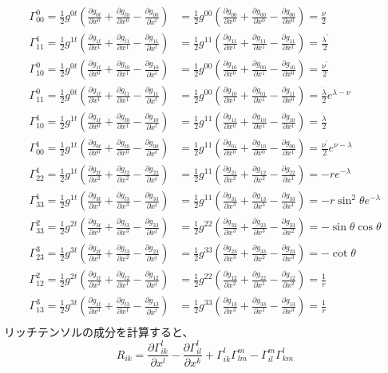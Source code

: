 \documentclass{jsarticle}
\newcommand{\pder}[2][]{\frac{\partial#1}{\partial#2}}
\newcommand{\pderx}[2][]{\pder[#1]{x^{#2}}}
\newcommand{\pdergx}[2][]{\pderx[g_{#1}]{#2}}
\newcommand{\half}{\frac{1}{2}}
\newcommand{\beq}{\begin{equation}}
\newcommand{\eeq}{\end{equation}}
\newcommand{\GaT}[3]{\Gamma^{#1}_{#2 #3}}
\newcommand{\Christfinside}[3]{\pdergx[#1 #3]{#2} + \pdergx[#3 #2]{#1} - \pdergx[#1 #2]{#3}}
\newcommand{\Christf}[4]{\Gamma^{#1}_{#2 #3}=\half g^{#1 #4}(\Christfinside{#2}{#3}{#4})}
\begin{document}
\begin{align}
    \Christf{0}{0}{0}{t} &=  \half g^{00} (\Christfinside{0}{0}{0}) = \frac{\dot{\nu}}{2}\\
    \Christf{1}{1}{1}{t} &=  \half g^{11} (\Christfinside{1}{1}{1}) = \frac{\lambda^\prime}{2}\\
    \Christf{0}{1}{0}{t} &=  \half g^{00} (\Christfinside{1}{0}{0}) = \frac{\nu^\prime}{2}\\
    \Christf{0}{1}{1}{t} &=  \half g^{00} (\Christfinside{1}{1}{0}) = \frac{\dot{\lambda}}{2}e^{\lambda - \nu}\\
    \Christf{1}{1}{0}{t} &=  \half g^{11} (\Christfinside{1}{0}{1}) = \frac{\dot{\lambda}}{2}\\
    \Christf{1}{0}{0}{t} &=  \half g^{11} (\Christfinside{0}{0}{1}) = \frac{\nu^\prime }{2}e^{\nu - \lambda}\\
    \Christf{1}{2}{2}{t} &=  \half g^{11} (\Christfinside{2}{2}{1}) = -re^{-\lambda}\\
    \Christf{1}{3}{3}{t} &=  \half g^{11} (\Christfinside{3}{3}{1}) = -r\sin^2 \theta e^{-\lambda}\\
    \Christf{2}{3}{3}{t} &=  \half g^{22} (\Christfinside{3}{3}{2}) = -\sin\theta \cos\theta\\
    \Christf{3}{2}{3}{t} &=  \half g^{33} (\Christfinside{2}{3}{3}) = -\cot\theta\\
    \Christf{2}{1}{2}{t} &=  \half g^{22} (\Christfinside{1}{2}{2}) = \frac{1}{r}\\
    \Christf{3}{1}{3}{t} &=  \half g^{33} (\Christfinside{1}{3}{3}) = \frac{1}{r}\\
\end{align}
リッチテンソルの成分を計算すると、
\beq
    R_{ik} =  \pder[\Gamma^l_{ik}]{x^l} - \pder[\Gamma^l_{il}]{x^k}
    + \GaT{l}{i}{k}\GaT{m}{l}{m} - \GaT{m}{i}{l}\GaT{l}{k}{m}
\eeq
\end{document}
